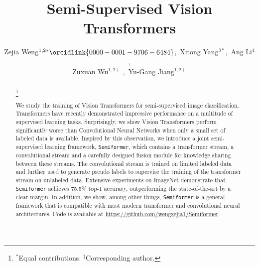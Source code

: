\documentclass[runningheads]{llncs}
\makeatletter
\newcommand*{\system}{\texttt{Semiformer}\@\xspace}
\makeatother
\begin{document}
\pagestyle{headings}
\mainmatter
\def\ECCVSubNumber{3393}  \sloppy
\newcommand\blfootnote[1]{\begingroup
  \renewcommand\thefootnote{}\footnote{#1}\addtocounter{footnote}{-1}\endgroup
}


\title{Semi-Supervised Vision Transformers} 





\author{Zejia Weng$^{1,2*}\orcidlink{0000-0001-9706-6484}$,\, Xitong Yang$^ {3*}$,\, Ang Li$^{4}$, \\ Zuxuan Wu$^{1,2\dagger}$ ,\, Yu-Gang Jiang$^{1,2\dagger}$
}


\maketitle

\begin{abstract}
\blfootnote{$^*$Equal contributions. $^{\dagger}$Corresponding author.}
We study the training of Vision Transformers for semi-supervised image classification. Transformers have recently demonstrated impressive performance on a multitude of supervised learning tasks. Surprisingly, we show Vision Transformers perform significantly worse than Convolutional Neural Networks when only a small set of labeled data is available. Inspired by this observation, we introduce a joint semi-supervised learning framework, \system, which contains a transformer stream, a convolutional stream and a carefully designed fusion module for knowledge sharing between these streams. The convolutional stream is trained on limited labeled data and further used to generate pseudo labels to supervise the training of the transformer stream on unlabeled data. Extensive experiments on ImageNet demonstrate that \system achieves 75.5\% top-1 accuracy, outperforming the state-of-the-art by a clear margin. In addition, we show, among other things, \system is a general framework that is compatible with most modern transformer and convolutional neural architectures. Code is available at \href{https://github.com/wengzejia1/Semiformer}{https://github.com/wengzejia1/Semiformer}.


\end{abstract}
\end{document}
